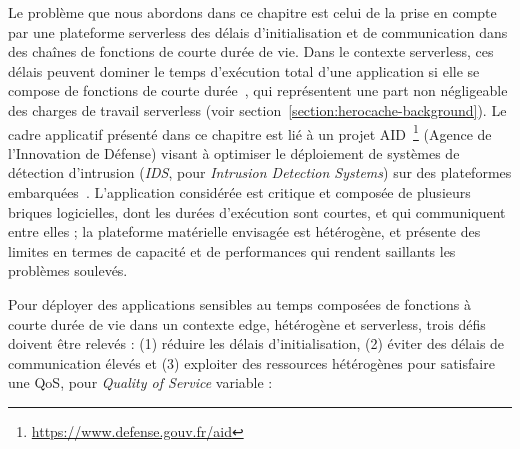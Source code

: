 Le problème que nous abordons dans ce chapitre est celui de la prise en compte par une plateforme serverless des délais d'initialisation et de communication dans des chaînes de fonctions de courte durée de vie.
Dans le contexte serverless, ces délais peuvent dominer le temps d'exécution total d'une application si elle se compose de fonctions de courte durée~\cite{yanHermesEfficientCache2020}, qui représentent une part non négligeable des charges de travail serverless (voir section~\ref{section:herocache-background}).
Le cadre applicatif présenté dans ce chapitre est lié à un projet AID~\footnote{\href{https://www.defense.gouv.fr/aid}{https://www.defense.gouv.fr/aid}} (Agence de l'Innovation de Défense) visant à optimiser le déploiement de systèmes de détection d'intrusion (\textit{IDS}, pour \textit{Intrusion Detection Systems}) sur des plateformes embarquées~\cite{SLIMANI2024}. L'application considérée est critique et composée de plusieurs briques logicielles, dont les durées d'exécution sont courtes, et qui communiquent entre elles ; la plateforme matérielle envisagée est hétérogène, et présente des limites en termes de capacité et de performances qui rendent saillants les problèmes soulevés.

Pour déployer des applications sensibles au temps composées de fonctions à courte durée de vie dans un contexte edge, hétérogène et serverless, trois défis doivent être relevés : (1) réduire les délais d'initialisation, (2) éviter des délais de communication élevés et (3) exploiter des ressources hétérogènes pour satisfaire une \gls{QoS}, pour \textit{Quality of Service} variable :

